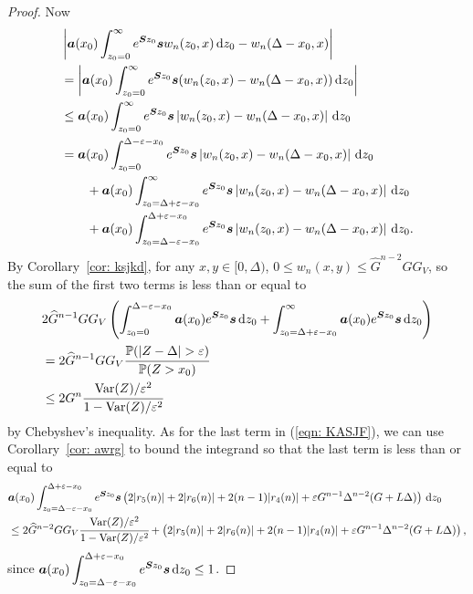 \begin{proof}
	Now
	\begin{align}
		\nonumber&\left|\boldsymbol a (x_0) \int_{z_0=0}^\infty e^{\boldsymbol Sz_0}\boldsymbol sw_n(z_0,x)\, \mathrm{d} z_0 - w_n(\Delta - x_0,x) \right|
		\\\nonumber&= \left|\boldsymbol a (x_0) \int_{z_0=0}^\infty e^{\boldsymbol Sz_0}\boldsymbol s(w_n(z_0,x) - w_n(\Delta - x_0,x)) \, \mathrm{d} z_0\right|
		\\\nonumber&\leq \boldsymbol a (x_0) \int_{z_0=0}^\infty e^{\boldsymbol Sz_0}\boldsymbol s  \left|w_n(z_0,x) - w_n(\Delta - x_0,x)\right| \, \mathrm{d} z_0
		\\\nonumber&= \boldsymbol a (x_0) \int_{z_0=0}^{\Delta-\varepsilon-x_0} e^{\boldsymbol Sz_0}\boldsymbol s  \left|w_n(z_0,x) - w_n(\Delta - x_0,x)\right| \, \mathrm{d} z_0
		\\\nonumber&\qquad{}+\boldsymbol a (x_0) \int_{z_0=\Delta+\varepsilon-x_0}^\infty e^{\boldsymbol Sz_0}\boldsymbol s  \left|w_n(z_0,x) - w_n(\Delta - x_0,x)\right| \, \mathrm{d} z_0
		\\\label{eqn: KASJF}&\qquad{}+\boldsymbol a (x_0) \int_{z_0=\Delta-\varepsilon-x_0}^{\Delta+\varepsilon-x_0} e^{\boldsymbol Sz_0}\boldsymbol s  \left|w_n(z_0,x) - w_n(\Delta - x_0,x)\right| \, \mathrm{d} z_0.
		\end{align}
		By Corollary~\ref{cor: ksjkd}, for any \(x,y\in [0,\Delta)\), \(0\leq w_n(x,y)\leq \widehat G^{n-2}GG_V\), so the sum of the first two terms is less than or equal to 
		\begin{align}
		&2\widehat G^{n-1}GG_V\left(\int_{z_0=0}^{\Delta-\varepsilon-x_0}\bs a(x_0)e^{\bs S z_0} \bs s \wrt z_0+\int_{z_0=\Delta+\varepsilon-x_0}^\infty \bs a(x_0)e^{\bs S z_0} \bs s \wrt z_0\right)
		\\\nonumber &= 2\widehat G^{n-1}GG_V \cfrac{\mathbb P(|Z-\Delta|> \varepsilon)}{\mathbb P(Z> x_0)}
		\\&\leq 2G^n\cfrac{\var(Z)/\varepsilon^2}{1-\var(Z)/\varepsilon^2}
		\end{align}
		by Chebyshev's inequality. As for the last term in (\ref{eqn: KASJF}), we can use Corollary~\ref{cor: awrg} to bound the integrand so that the last term is less than or equal to 
		\begin{align}
		\nonumber&\boldsymbol a (x_0) \int_{z_0=\Delta-\varepsilon-x_0}^{\Delta+\varepsilon-x_0} e^{\boldsymbol Sz_0}\boldsymbol s \left( 2|r_5(n)| + 2|r_6(n)| + 2(n-1)|r_4(n)| + \varepsilon G^{n-1}\Delta^{n-2}(G+L\Delta) \right) \, \mathrm{d} z_0
		\\\nonumber&\leq 2\widehat G^{n-2}GG_V\cfrac{\mathrm{Var}(Z)/\varepsilon^2}{1-\mathrm{Var}(Z)/\varepsilon^2}
		+ \left( 2|r_5(n)| + 2|r_6(n)| + 2(n-1)|r_4(n)| + \varepsilon G^{n-1}\Delta^{n-2}(G+L\Delta) \right) ,
	\end{align}
	since \(\displaystyle \boldsymbol a (x_0) \int_{z_0=\Delta-\varepsilon-x_0}^{\Delta+\varepsilon-x_0} e^{\boldsymbol Sz_0}\boldsymbol s\, \mathrm{d} z_0\leq 1\). 
\end{proof}

